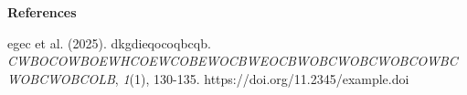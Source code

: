 \documentclass[12pt]{article}
\begin{document}
\noindent
\textbf{References}

\vspace{10pt}

\noindent
[6] egec et al. (2025). dkgdieqocoqbcqb. \textit{CWBOCOWBOEWHCOEWCOBEWOCBWEOCBWOBCWOBCWOBCOWBCWOBCWOBCOLB}, \textit{1}(1), 130-135. https://doi.org/11.2345/example.doi
\end{document}
